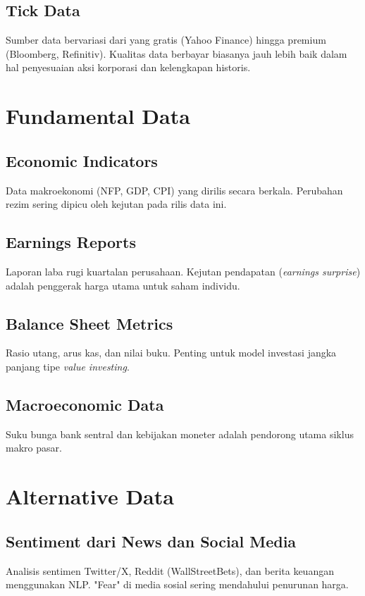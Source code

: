 \documentclass[12pt,a4paper]{book}
\begin{document}
\subsection{Tick Data}
Sumber data bervariasi dari yang gratis (Yahoo Finance) hingga premium (Bloomberg, Refinitiv). Kualitas data berbayar biasanya jauh lebih baik dalam hal penyesuaian aksi korporasi dan kelengkapan historis.

\section{Fundamental Data}
\subsection{Economic Indicators}
Data makroekonomi (NFP, GDP, CPI) yang dirilis secara berkala. Perubahan rezim sering dipicu oleh kejutan pada rilis data ini.

\subsection{Earnings Reports}
Laporan laba rugi kuartalan perusahaan. Kejutan pendapatan (\textit{earnings surprise}) adalah penggerak harga utama untuk saham individu.

\subsection{Balance Sheet Metrics}
Rasio utang, arus kas, dan nilai buku. Penting untuk model investasi jangka panjang tipe \textit{value investing}.

\subsection{Macroeconomic Data}
Suku bunga bank sentral dan kebijakan moneter adalah pendorong utama siklus makro pasar.

\section{Alternative Data}
\subsection{Sentiment dari News dan Social Media}
Analisis sentimen Twitter/X, Reddit (WallStreetBets), dan berita keuangan menggunakan NLP. "Fear" di media sosial sering mendahului penurunan harga.
\end{document}
